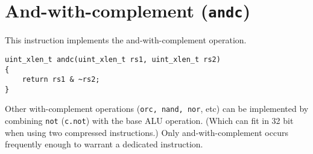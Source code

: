 
\section{And-with-complement (\texttt{andc})}

This instruction implements the and-with-complement operation.

\begin{verbatim}
uint_xlen_t andc(uint_xlen_t rs1, uint_xlen_t rs2)
{
    return rs1 & ~rs2;
}
\end{verbatim}

Other with-complement operations ({\tt orc, nand, nor}, etc) can be implemented
by combining {\tt not} ({\tt c.not}) with the base ALU operation. (Which can
fit in 32 bit when using two compressed instructions.) Only and-with-complement
occurs frequently enough to warrant a dedicated instruction.



%
%
%
%
%
%


